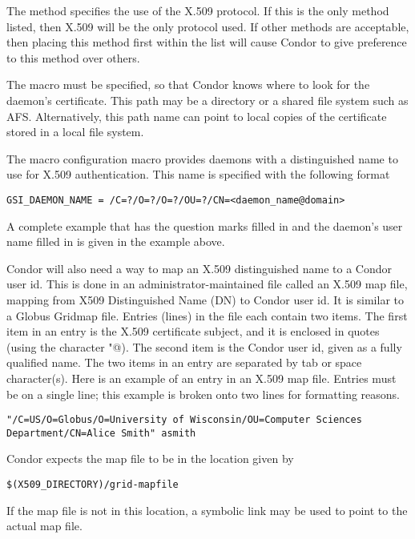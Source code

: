 \begin{description}
The  method specifies the use of
the X.509 protocol. 
If this is the only method listed, then X.509 will be the only
protocol used.
If other methods are acceptable, then placing this method
first within the list will cause Condor to give preference to
this method over others.

The macro  must be specified,
so that Condor knows where to look for the daemon's certificate.
This path may be a directory or a shared file system such as AFS. 
Alternatively, this path name
can point to 
local copies of the certificate stored
in a local file system.

The macro  configuration macro
provides daemons with a distinguished name to use for
X.509 authentication.
This name is specified with the following format
\footnotesize
\begin{verbatim}
GSI_DAEMON_NAME = /C=?/O=?/O=?/OU=?/CN=<daemon_name@domain>
\end{verbatim}
\normalsize
A complete example that has the question marks filled in and the
daemon's user name filled in is given in the 
example above.

Condor will also need a way to map an X.509 distinguished
name to a Condor user id.
This is done in an administrator-maintained file called an X.509 map file,
mapping from X509 Distinguished Name (DN) to Condor user id.
It is similar to a Globus Gridmap file.
Entries (lines) in the file each contain two items.
The first item in an entry is the 
X.509 certificate subject, and it is enclosed in quotes
(using the character \verb@"@).
The second item is the Condor user id, given as a
fully qualified name.
The two items in an entry are separated by tab or space character(s).
Here is an example of an entry in an X.509 map file.
Entries must be on a single line; this example is broken
onto two lines for formatting reasons.

\footnotesize
\begin{verbatim}
"/C=US/O=Globus/O=University of Wisconsin/OU=Computer Sciences
Department/CN=Alice Smith" asmith
\end{verbatim}
\normalsize

Condor expects the map file to be in the location given by
\begin{verbatim}
$(X509_DIRECTORY)/grid-mapfile
\end{verbatim}
If the map file is not in this location, a symbolic link
may be used to point to the actual map file.


\end{description}
